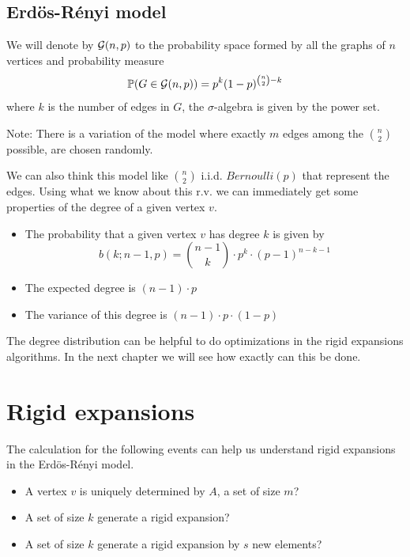 \subsection{Erdös-Rényi model}
\begin{defini}
We will denote by $\mathcal{G}(n,p)$ to the probability space formed by all the graphs of $n$ vertices and probability measure 
$$ \mathbb{P}(G\in \mathcal{G}(n,p)) = p^{k} (1-p)^{\binom{n}{2}-k} $$
where $k$ is the number of edges in $G$, the $\sigma$-algebra is given by the power set.
\end{defini}

Note: There is a variation of the model where exactly $m$ edges among the $\binom{n}{2}$ possible, are chosen randomly.

We can also think this model like $\binom{n}{2}$ i.i.d. $Bernoulli(p)$ that represent the edges. Using what we know about this r.v. we can immediately get some properties of the degree of a given vertex $v$.

\begin{itemize}
\item The probability that a given vertex $v$ has degree $k$ is given by
$$b(k; n-1,p) = \binom{n-1}{k} \cdot p^{k} \cdot (p-1)^{n-k-1}$$
\item The expected degree is $(n-1)\cdot p$
\item The variance of this degree is $(n-1)\cdot p \cdot (1-p)$
\end{itemize}

The degree distribution can be helpful to do optimizations in the rigid expansions algorithms. In the next chapter we will see how exactly can this be done.

\section{Rigid expansions}

The calculation for the following events can help us understand rigid expansions in the Erdös-Rényi model.

\begin{itemize}
\item A vertex $v$ is uniquely determined by $A$, a set of size $m$?
\item A set of size $k$ generate a rigid expansion?
\item A set of size $k$ generate a rigid expansion by $s$ new elements?
\end{itemize}

